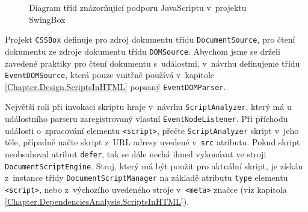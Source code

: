 \begin{figure}[H]
  \begin{center}
    \caption{Diagram tříd znázorňující podporu JavaScriptu v~projektu SwingBox}
    \label{Figure.ScriptsInSwingBoxDesign}
  \end{center}
\end{figure}

Projekt \texttt{CSSBox} definuje pro zdroj dokumentu třídu \texttt{DocumentSource}, pro čtení dokumentu ze zdroje dokumentu třídu \texttt{DOMSource}. Abychom jsme se drželi zavedené praktiky pro čtení dokumentu s~událostmi, v~návrhu definujeme třídu \texttt{EventDOMSource}, která pouze vnitřně používá v~kapitole \ref{Chapter.Design.ScriptsInHTML} popsaný \texttt{EventDOMParser}. 

Největší roli při invokaci skriptu hraje v~návrhu \texttt{ScriptAnalyzer}, který má u událostního parseru zaregistrovaný vlastní \texttt{EventNodeListener}. Při příchodu události o~zpracování elementu \texttt{<script>}, přečte \texttt{ScriptAnalyzer} skript v~jeho těle, případně načte skript z~URL adresy uvedené v~\texttt{src} atributu. Pokud skript neobsahoval atribut \texttt{defer}, tak se dále nechá ihned vykonávat ve stroji \texttt{DocumentScriptEngine}. Stroj, který má být použit pro aktuální skript, je získán z~instance třídy \texttt{DocumentScriptManager} na základě atributu \texttt{type} elementu \texttt{<script>}, nebo z~výchozího uvedeného stroje v~\texttt{<meta>} značce (viz kapitola \ref{Chapter.DependenciesAnalysis.ScriptsInHTML}).

